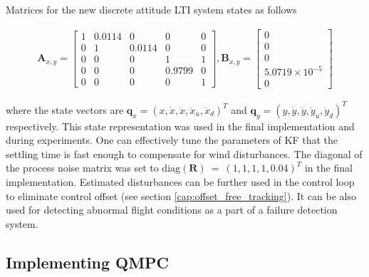 Matrices for the new discrete attitude LTI system states as follows	

\begin{equation}
\begin{split}
\mathbf{A}_{x, y} = \begin{bmatrix}
1 & 0.0114 & 0 & 0 & 0 \\
0 & 1 & 0.0114 & 0 & 0\\
0 & 0 & 0 & 1 & 1 \\
0 & 0 & 0 & 0.9799 & 0 \\
0 & 0 & 0 & 0 & 1
\end{bmatrix}, \mathbf{B}_{x, y} = \begin{bmatrix}
0\\
0\\
0\\
5.0719 \times 10^{-5}\\
0
\end{bmatrix}
\end{split}
\label{eq:attitude_LTI_big_identified}
\end{equation}

where the state vectors are $\mathbf{q}_{x} = \left(x, \dot{x}, \ddot{x}, \ddot{x}_u, \ddot{x}_d\right)^T$ and $\mathbf{q}_{y} = \left(y, \dot{y}, \ddot{y}, \ddot{y}_u, \ddot{y}_d\right)^T$ respectively. This state representation was used in the final implementation and during experiments. One can effectively tune the parameters of KF that the settling time is fast enough to compensate for wind disturbances. The diagonal of the process noise matrix was set to $\mathrm{diag}(\textbf{R})~=~\left(1, 1, 1, 1, 0.04\right)^T$ in the final implementation. Estimated disturbances can be further used in the control loop to eliminate control offset (see section \ref{cap:offset_free_tracking}). It can be also used for detecting abnormal flight conditions as a part of a failure detection system.
 
\subsection{Implementing QMPC}
\label{cap:implementing_qmpc}

